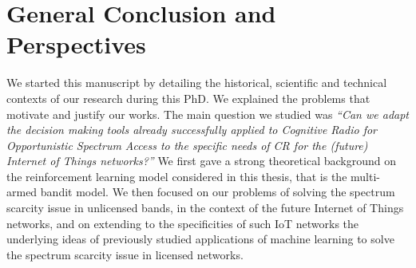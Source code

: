 
\chapter{General Conclusion and Perspectives}
\label{chapter:conclusion}

\graphicspath{{2-Chapters/6-Chapter/Images/}}





We started this manuscript by detailing the historical, scientific and technical contexts of our research during this PhD.
%
We explained the problems that motivate and justify our works.
%
The main question we studied was \emph{``Can we adapt the decision making tools already successfully applied to Cognitive Radio for Opportunistic Spectrum Access to the specific needs of CR for the (future) Internet of Things networks?''}
%
We first gave a strong theoretical background on the reinforcement learning model considered in this thesis, that is the multi-armed bandit model.
We then focused on our problems of solving the spectrum scarcity issue in unlicensed bands, in the context of the future Internet of Things networks,
and on extending to the specificities of such IoT networks the underlying ideas of previously studied applications of machine learning to solve the spectrum scarcity issue in licensed networks.


